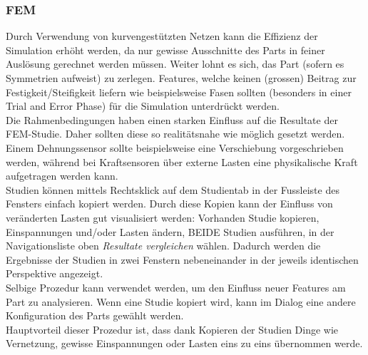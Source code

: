 \documentclass[12pt,a4paper]{article}
\begin{document}
	\subsubsection{FEM}
	Durch Verwendung von kurvengestützten Netzen kann die Effizienz der Simulation erhöht werden, da nur gewisse Ausschnitte des Parts in feiner Auslösung gerechnet werden müssen. Weiter lohnt es sich, das Part (sofern es Symmetrien aufweist) zu zerlegen. Features, welche keinen (grossen) Beitrag zur Festigkeit/Steifigkeit liefern wie beispielsweise Fasen sollten (besonders in einer Trial and Error Phase) für die Simulation unterdrückt werden.\\
	Die Rahmenbedingungen haben einen starken Einfluss auf die Resultate der FEM-Studie. Daher sollten diese so realitätsnahe wie möglich gesetzt werden. Einem Dehnungssensor sollte beispielsweise eine Verschiebung vorgeschrieben werden, während bei Kraftsensoren über externe Lasten eine physikalische Kraft aufgetragen werden kann. \\
	Studien können mittels Rechtsklick auf dem Studientab in der Fussleiste des Fensters einfach kopiert werden. Durch diese Kopien kann der Einfluss von veränderten Lasten gut visualisiert werden: Vorhanden Studie kopieren, Einspannungen und/oder Lasten ändern, BEIDE Studien ausführen, in der Navigationsliste oben \textit{Resultate vergleichen} wählen. Dadurch werden die Ergebnisse der Studien in zwei Fenstern nebeneinander in der jeweils identischen Perspektive angezeigt.\\
	Selbige Prozedur kann verwendet werden, um den Einfluss neuer Features am Part zu analysieren. Wenn eine Studie kopiert wird, kann im Dialog eine andere Konfiguration des Parts gewählt werden.\\
	Hauptvorteil dieser Prozedur ist, dass dank Kopieren der Studien Dinge wie Vernetzung, gewisse Einspannungen oder Lasten eins zu eins übernommen werde.
\end{document}
